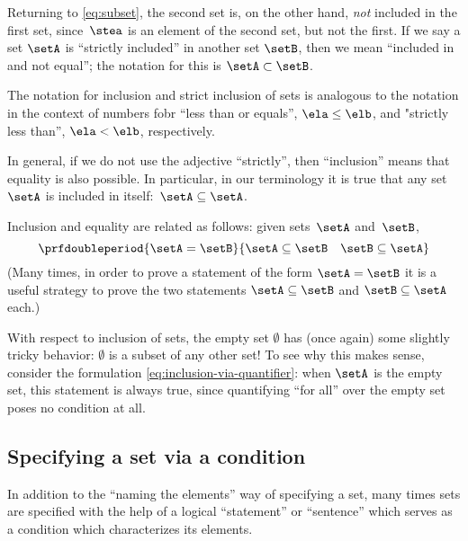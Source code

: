 Returning to \cref{eq:subset}, the second set is, on the other hand, \emph{not} included in the first set, since~$\stea$ is an element of the second set, but not the first.
If we say a set $\setA$ is ``strictly included'' in another set $\setB$, then we mean ``included in and not equal''; the notation for this is $\setA \subset \setB$.

The notation for inclusion and strict inclusion of sets is analogous to the notation in the context of numbers fobr ``less than or equals'', $\ela \leq \elb$,  and "strictly less than'', $\ela < \elb$, respectively.

In general, if we do not use the adjective ``strictly'', then ``inclusion'' means that equality is also possible.
In particular, in our terminology it is true that any set~$\setA$ is included in itself:~$\setA \subseteq \setA$.

Inclusion and equality are related as follows: given sets~$\setA$ and~$\setB$,
%
\begin{equation*}
    \prfdoubleperiod{
        \setA = \setB
    }{
        {\setA \subseteq \setB}
        \quad
        {\setB \subseteq \setA}
    }
\end{equation*}
%
(Many times, in order to prove a statement of the form $\setA = \setB$ it is a useful strategy to prove the two statements $\setA \subseteq \setB$ and $\setB \subseteq \setA$ each.)

With respect to inclusion of sets, the empty set $\emptyset$ has (once again) some slightly tricky behavior: $\emptyset$ is a subset of any other set!
To see why this makes sense, consider the formulation \cref{eq:inclusion-via-quantifier}: when $\setA$ is the empty set, this statement is always true, since quantifying ``for all'' over the empty set poses no condition at all.

\subsection{Specifying a set via a condition}

In addition to the ``naming the elements'' way of specifying a set, many times sets are specified with the help of a logical ``statement'' or ``sentence'' which serves as a condition which characterizes its elements.

